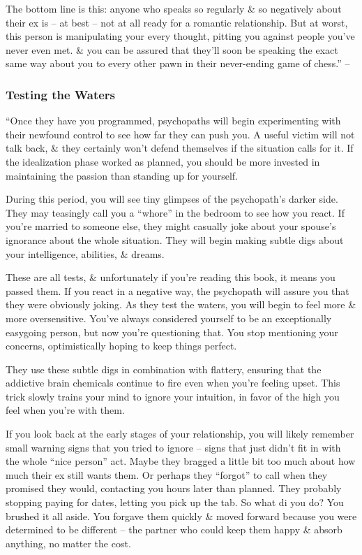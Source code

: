 \documentclass{article}
\numberwithin{equation}{section}
\begin{document}
The bottom line is this: anyone who speaks so regularly \& so negatively about their ex is -- at best -- not at all ready for a romantic relationship. But at worst, this person is manipulating your every thought, pitting you against people you've never even met. \& you can be assured that they'll soon be speaking the exact same way about you to every other pawn in their never-ending game of chess.'' -- \cite[p. 35]{MacKenzie2015}

\subsubsection{Testing the Waters}
``Once they have you programmed, psychopaths will begin experimenting with their newfound control to see how far they can push you. A useful victim will not talk back, \& they certainly won't defend themselves if the situation calls for it. If the idealization phase worked as planned, you should be more invested in maintaining the passion than standing up for yourself.

During this period, you will see tiny glimpses of the psychopath's darker side. They may teasingly call you a ``whore'' in the bedroom to see how you react. If you're married to someone else, they might casually joke about your spouse's ignorance about the whole situation. They will begin making subtle digs about your intelligence, abilities, \& dreams.

These are all tests, \& unfortunately if you're reading this book, it means you passed them. If you react in a negative way, the psychopath will assure you that they were obviously joking. As they test the waters, you will begin to feel more \& more oversensitive. You've always considered yourself to be an exceptionally easygoing person, but now you're questioning that. You stop mentioning your concerns, optimistically hoping to keep things perfect.

They use these subtle digs in combination with flattery, ensuring that the addictive brain chemicals continue to fire even when you're feeling upset. This trick slowly trains your mind to ignore your intuition, in favor of the high you feel when you're with them.

If you look back at the early stages of your relationship, you will likely remember small warning signs that you tried to ignore -- signs that just didn't fit in with the whole ``nice person'' act. Maybe they bragged a little bit too much about how much their ex still wants them. Or perhaps they ``forgot'' to call when they promised they would, contacting you hours later than planned. They probably stopping paying for dates, letting you pick up the tab. So what di you do? You brushed it all aside. You forgave them quickly \& moved forward because you were determined to be different -- the partner who could keep them happy \& absorb anything, no matter the cost.
\end{document}
